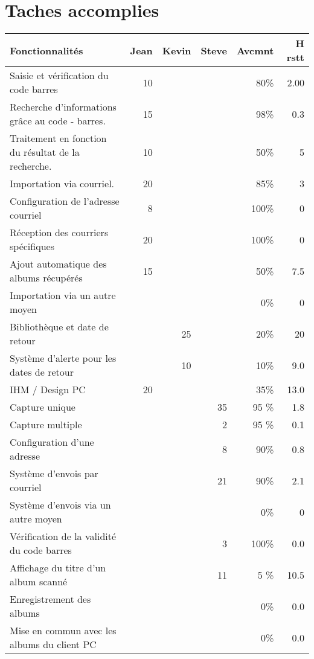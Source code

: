 \documentclass[]{support-iutrs} %
\begin{document}
	
\header

\section{Taches accomplies} 
\begin{tabular}{|l|r|r|r|r|r|}
\hline 
\textbf{Fonctionnalités} & \textbf{Jean} & \textbf{Kevin} & \textbf{Steve} & \textbf{Avcmnt} & \textbf{H rstt} \\
\hline
Saisie et vérification du code barres & 10 & & & 80\% & 2.00 \\
			 \hline
Recherche d'informations grâce au code - barres. & 15 & & & 98\% & 0.3 \\
\hline
Traitement en fonction du résultat de la recherche. & 10 & & & 50\% & 5 \\
				   \hline
Importation via courriel. & 20 & & & 85\% & 3 \\
					\hline
Configuration de l'adresse courriel & 8 & & & 100\% & 0 \\
					  \hline
Réception des courriers spécifiques & 20 & & & 100\% & 0 \\
		\hline
Ajout automatique des albums récupérés & 15 & & & 50\% & 7.5 \\
			\hline
Importation via un autre moyen & & & & 0\% & 0 \\
					\hline
Bibliothèque et date de retour & & 25 & & 20\% & 20 \\
		\hline
Système d'alerte pour les dates de retour & & 10 & & 10\% & 9.0 \\
		\hline
IHM \slash{} Design PC & 20 & & & 35\% & 13.0 \\
\hline 
Capture unique & & & 35 & 95 \% & 1.8 \\
			  \hline
Capture multiple & & & 2 & 95 \% & 0.1 \\
			  \hline
Configuration d'une adresse & & & 8 & 90\% & 0.8 \\
			\hline
Système d'envois par courriel & & & 21 & 90\% & 2.1 \\
		\hline
Système d'envois via un autre moyen & & & & 0\% & 0 \\
		\hline
Vérification de la validité du code barres & & & 3 & 100\% & 0.0 \\
		\hline
Affichage du titre d'un album scanné & & & 11 & 5 \% & 10.5 \\
				 \hline
Enregistrement des albums & & & & 0\% & 0.0 \\
						\hline
Mise en commun avec les albums du client PC & & & & 0\% & 0.0 \\

\end{tabular}
\end{document}
